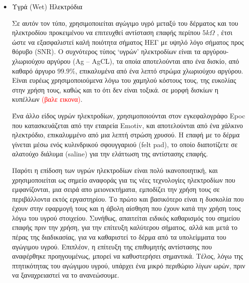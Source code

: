 \documentclass[11pt,a4paper,english,greek,twoside]{../Thesis}
\begin{document}
\begin{itemize}
    \item{Υγρά (Wet) Ηλεκτρόδια}
    \par Σε αυτόν τον τύπο, χρησιμοποιείται αγώγιμο υγρό μεταξύ του δέρματος και του ηλεκτροδίου προκειμένου να επιτευχθεί αντίσταση επαφής περίπου $5kΩ$ \cite{}, έτσι ώστε να εξασφαλιστεί καλή ποιότητα σήματος ΗΕΓ με υψηλό λόγο σήματος προς θόρυβο (SNR). Ο συχνότερος τύπος ‘υγρών’ ηλεκτροδίων είναι τα αργύρου-χλωριούχου αργύρου (Ag – AgCL), τα οποία αποτελούνται απο ένα δισκίο, από καθαρό άργυρο $99.9\% $, επικαλυμένα από ένα λεπτό στρώμα χλωριούχου αργύρου. Είναι ευρέως χρησιμοποιούμενα λόγω του χαμηλού κόστους τους, της ευκολίας στην χρήση τους, καθώς και το ότι δεν είναι τοξικά. σε μορφή δισκίων η κυπέλλων \textcolor{red}{(βαλε εικονα)}.  
    \par Ένα άλλο είδος υγρών ηλεκτροδίων, χρησιμοποιούνται στον εγκεφαλογράφο Epoc που κατασκευάζεται από την εταιρεία Emotiv, και αποτελούνται από ένα χάλκινο ηλεκτρόδιο, επικαλυμμένο από μια λεπτή στρώση χρυσού. Η επαφή με το δέρμα γίνεται μέσω ενός κυλινδρικού σφουγγαριού (felt pad), το οποίο διαποτίζετε σε αλατούχο διάλυμα (saline) για την ελάττωση της αντίστασης επαφής.
    \par Παρότι η επίδοση των υγρών ηλεκτροδίων είναι πολύ ικανοποιητική, και χρησιμοποιείται ως σημείο αναφοράς για τις νέες τεχνολογίες ηλεκτροδίων που εμφανίζονται, μια σειρά απο μειονεκτήματα, εμποδίζει την χρήση τους σε περιβάλλοντα εκτός εργαστηρίου. Το πρώτο και βασικότερο είναι η δυσκολία που έχουν στην εφαρμογή τους και η άβολη αίσθηση που έχουν κατά την χρήση τους λόγω του υγρού στοιχείου. Συνήθως, απαιτείται ειδικός καθαρισμός  του σημείου επαφής πριν την χρήση, για την επίτευξη καλύτερου σήματος, αλλά και μετά το πέρας της διαδικασίας, για να καθαριστεί το δέρμα από  τα υπολείμματα του αγώγιμου υγρού. Επιπλέον, η επίτευξη της επιθυμητής αντίστασης που αναφέρθηκε προηγουμένως, μπορεί να καθυστερήσει σημαντικά. Τέλος, λόγω της πτητικότητας του αγώγιμου υγρού, υπάρχει ένα μικρό περιθώριο λίγων ωρών, πριν να ξαναχρειαστεί να το ανανεώσουμε.
    

\end{itemize}
\end{document}

